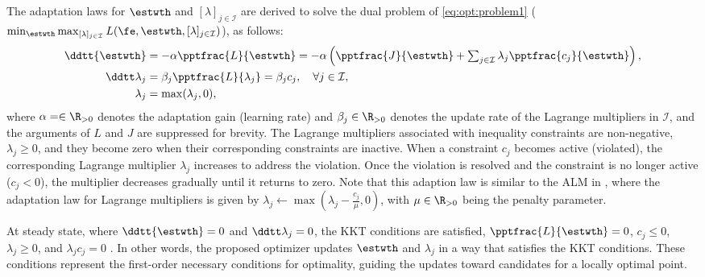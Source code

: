 \documentclass[final,5p,times,twocolumn,authoryear]{elsarticle}
\begin{document}
The adaptation laws for $\estwth$ and $[\lambda]_{j\in\mathcal I}$ are derived to solve the dual problem of \eqref{eq:opt:problem1} (\ie  $\min_{\estwth} \max_{[\lambda]_{j\in\mathcal I}}L(\fe,\estwth,[\lambda]_{j\in\mathcal I})$), as follows:
\begin{subequations}
    \begin{align}
            \ddtt{\estwth}
            &
            =
            -\alpha \pptfrac{L}{\estwth}
            =
            -\alpha 
            \left(
                \pptfrac{J}{\estwth}
                +
                \textstyle\sum_{j\in\mathcal{I}}
                \lambda_j 
                \pptfrac{c_j}{\estwth}
            \right),
        \label{eq:adap:th}
            \\
            \ddtt\lambda_j
            & 
            = 
            \beta_j\pptfrac{L}{\lambda_j} 
            = 
            \beta_j c_j ,
            \quad \forall j\in\mathcal I,
        \label{eq:adap:lbd}
            \\
            \lambda_j & = \max(\lambda_j,0) ,
        \label{eq:adap:lbd:max}
    \end{align}
    \label{eq:adaptation law}
\end{subequations}
where $\alpha=\in\R_{>0}$ denotes the adaptation gain (learning rate) and $\beta_j\in\R_{>0}$ denotes the update rate of the Lagrange multipliers in $\mathcal I$, and the arguments of $L$ and $J$ are suppressed for brevity. 
The Lagrange multipliers associated with inequality constraints are non-negative, \ie $\lambda_j\ge 0$, and they become zero when their corresponding constraints are inactive. When a constraint $c_j$ becomes active (\ie violated), the corresponding Lagrange multiplier $\lambda_j$ increases to address the violation. Once the violation is resolved and the constraint is no longer active (\ie $c_j < 0$), the multiplier decreases gradually until it returns to zero. Note that this adaption law is similar to the ALM in \cite{Nocedal:2006aa}, where the adaptation law for Lagrange multipliers is given by $\lambda_j\leftarrow \max(\lambda_j-\tfrac{c_j}{\mu},0)$, with $\mu\in\R_{>0}$ being the penalty parameter. 

At steady state, where $\ddtt{\estwth}=0$ and $\ddtt\lambda_j=0$, the KKT conditions are satisfied, \ie $\pptfrac{L}{\estwth}=0$, $c_j \le 0$, $\lambda_j \ge 0$, and $\lambda_j c_j=0$ \cite[Chap.~12 T.~12.1]{Nocedal:2006aa}.
In other words, the proposed optimizer updates $\estwth$ and $\lambda_j$ in a way that satisfies the KKT conditions. 
These conditions represent the first-order necessary conditions for optimality, guiding the updates toward candidates for a locally optimal point.
\end{document}
